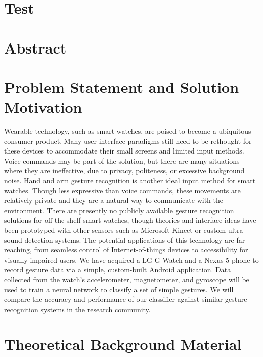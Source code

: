 \documentclass{article}
\begin{document}
\section{Test}\label{test}

\section{Abstract}

\section{Problem Statement and Solution Motivation}
Wearable technology, such as smart watches, are poised to become a ubiquitous consumer product. Many user interface paradigms still need to be rethought for these devices to accommodate their small screens and limited input methods.
Voice commands may be part of the solution, but there are many situations where they are ineffective, due to privacy, politeness, or excessive background noise.
Hand and arm gesture recognition is another ideal input method for smart watches. Though less expressive than voice commands, these movements are relatively private and they are a natural way to communicate with the environment.
There are presently no publicly available gesture recognition solutions for off-the-shelf smart watches, though theories and interface ideas have been prototyped with other sensors such as Microsoft Kinect or custom ultra-sound detection systems.
The potential applications of this technology are far-reaching, from seamless control of Internet-of-things devices to accessibility for visually impaired users.
We have acquired a LG G Watch and a Nexus 5 phone to record gesture data via a simple, custom-built Android  application. Data collected from the watch’s accelerometer, magnetometer, and gyroscope will be used to train a neural network to classify a set of simple gestures. We will compare the accuracy and performance of our classifier against similar gesture recognition systems in the research community.

\section{Theoretical Background Material}
\end{document}
